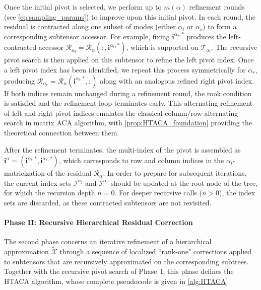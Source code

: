 \documentclass{article}
\theoremstyle{plain}
\theoremstyle{definition}
\theoremstyle{remark}
\begin{document}
Once the initial pivot is selected, we perform up to $m(\alpha)$ refinement rounds (see \eqref{eq:sampling_params}) to improve upon this initial pivot. In each round, the residual is contracted along one subset of modes (either $\alpha_l$ or $\alpha_r$) to form a corresponding subtensor accessor. For example, fixing $\bm{i}^{\alpha_r,*}$ produces the left-contracted accessor $\mathcal{R}_{\alpha_l} = \mathcal{R}_{\alpha}(:, \bm{i}^{\alpha_r,*})$, which is supported on $\mathcal{T}_{\alpha_l}$. The recursive pivot search is then applied on this subtensor to refine the left pivot index. Once a left pivot index has been identified, we repeat this process symmetrically for $\alpha_r$, producing $\mathcal{R}_{\alpha_r} = \mathcal{R}_{\alpha}(\bm{i}^{\alpha_l,*}, :)$ along with an analogous refined right pivot index. If both indices remain unchanged during a refinement round, the rook condition is satisfied and the refinement loop terminates early. This alternating refinement of left and right pivot indices emulates the classical column/row alternating search in matrix ACA algorithm, with \cref{prop:HTACA_foundation} providing the theoretical connection between them.

After the refinement terminates, the multi-index of the pivot is assembled as $\bm{i}^{\alpha} = (\bm{i}^{\alpha_l,*},\bm{i}^{\alpha_r,*})$, which corresponds to row and column indices in the $\alpha_{l}$-matricization of the residual $\mathcal{R}_{\alpha}$. In order to prepare for subsequent iterations, the current index sets $\mathcal{I}^{\alpha_l}$ and $\mathcal{I}^{\alpha_r}$ should be updated at the root node of the tree, for which the recursion depth $n = 0$. For deeper recursive calls ($n > 0$), the index sets are discarded, as these contracted subtensors are not revisited.

\paragraph{Phase II: Recursive Hierarchical Residual Correction} The second phase concerns an iterative refinement of a hierarchical approximation \(\widetilde{\mathcal{X}}\) through a sequence of localized ``rank-one" corrections applied to subtensors that are recursively approximated on the corresponding subtrees. Together with the recursive pivot search of Phase~I, this phase defines the HTACA algorithm, whose complete pseudocode is given in \cref{alg:HTACA}.
\end{document}
